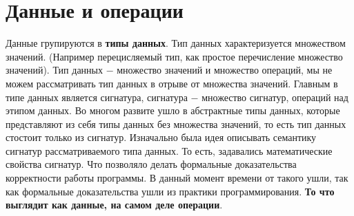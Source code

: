 \documentclass[a4paper, 12pt, titlepage, finall]{extreport}
\begin{document}
        \section {Данные и операции}
            Данные групируются в \textbf{типы данных}. Тип данных характеризуется множеством значений. (Например перецисляемый тип,
            как простое перечисление множество значений). Тип данных $-$ множество значений и множество операций, мы не можем рассматривать тип данных в отрыве от множества значений. 
            Главным в типе данных является сигнатура, сигнатура $-$ множество сигнатур, операций над этипом данных.
            Во многом развите ушло в абстрактные типы данных, которые представляют из себя типы данных без множества значений,
            то есть тип данных стостоит только из сигнатур. Изначально была идея описывать семантику сигнатур рассматриваемого типа данных.
            То есть, задавались математические свойства сигнатур. Что позволяло делать формальные доказательства корректности работы программы.
            В данный момент времени от такого ушли, так как формальные доказательства ушли из практики программирования.
            \textbf{То что выглядит как данные, на самом деле операции}.
\end{document}
